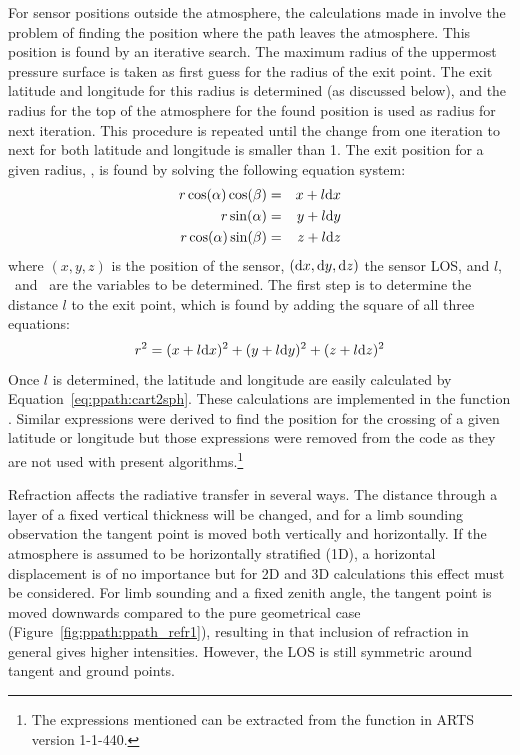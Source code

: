 For sensor positions outside the atmosphere, the calculations made in
 involve the problem of finding the
position where the path leaves the atmosphere. This position is found
by an iterative search. The maximum radius of the uppermost pressure
surface is taken as first guess for the radius of the exit point.  The
exit latitude and longitude for this radius is determined (as
discussed below), and the radius for the top of the atmosphere for the
found position is used as radius for next iteration. This procedure is
repeated until the change from one iteration to next for both latitude
and longitude is smaller than 1. The exit position for
a given radius, \Rds, is found by solving the following equation
system:
\begin{eqnarray}
  r \cos(\alpha) \cos(\beta)  & = & x+l\mathrm{d} x \nonumber \\
  r \sin(\alpha)             & = & y+l\mathrm{d} y \\
  r \cos(\alpha) \sin(\beta)  & = & z+l\mathrm{d} z \nonumber
  \label{eq:ppath:rcoss3Da}
\end{eqnarray}
where $(x,y,z)$ is the position of the sensor, $(\mathrm{d} x,\mathrm{d}
y,\mathrm{d} z)$ the sensor LOS, and $l$, \Lat\ and \Lon\ are the variables
to be determined. The first step is to determine the distance $l$ to
the exit point, which is found by adding the square of all three
equations:
\begin{equation}
  r^2 = (x+l\mathrm{d} x)^2 + (y+l\mathrm{d} y)^2 + (z+l\mathrm{d} z)^2
  \label{eq:ppath:rcoss3Db}
\end{equation}
Once $l$ is determined, the latitude and longitude are easily
calculated by Equation~\ref{eq:ppath:cart2sph}. These calculations are
implemented in the function .
Similar expressions were derived to find the position for the crossing
of a given latitude or longitude but those expressions were removed
from the code as they are not used with present
algorithms.\footnote{The expressions mentioned can be extracted from
  the function  in ARTS version
  1-1-440.}



\label{sec:ppath:refreuler}

Refraction affects the radiative transfer in several ways. The
distance through a layer of a fixed vertical thickness will be
changed, and for a limb sounding observation the tangent point is
moved both vertically and horizontally. If the atmosphere is assumed
to be horizontally stratified (1D), a horizontal displacement is of no
importance but for 2D and 3D calculations this effect must be
considered. For limb sounding and a fixed zenith angle, the tangent
point is moved downwards compared to the pure geometrical case
(Figure~\ref{fig:ppath:ppath_refr1}), resulting in that inclusion of
refraction in general gives higher intensities. However, the LOS is
still symmetric around tangent and ground points.

